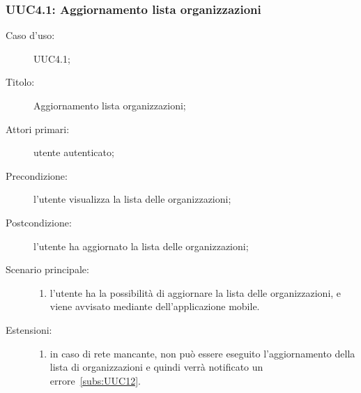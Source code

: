 \documentclass[../../../analisi-dei-requisiti.tex]{subfiles}
\begin{document}
\subsubsection{UUC4.1: Aggiornamento lista organizzazioni}%
\label{subs:UUC4.1}
\begin{description}
  \item[Caso d’uso:] UUC4.1;
  \item[Titolo:] Aggiornamento lista organizzazioni;
  \item[Attori primari:] utente autenticato;
  \item[Precondizione:] l'utente visualizza la lista delle organizzazioni;
  \item[Postcondizione:] l'utente ha aggiornato la lista delle organizzazioni;
  \item[Scenario principale:]
        \begin{enumerate}
          \item l'utente ha la possibilità di aggiornare la lista delle organizzazioni, e viene avvisato mediante  dell'applicazione mobile.
        \end{enumerate}
  \item[Estensioni:]
        \begin{enumerate}
          \item in caso di rete mancante, non può essere eseguito l'aggiornamento della lista di organizzazioni e quindi verrà notificato un errore~\ref{subs:UUC12}.
        \end{enumerate}
\end{description}
\end{document}
